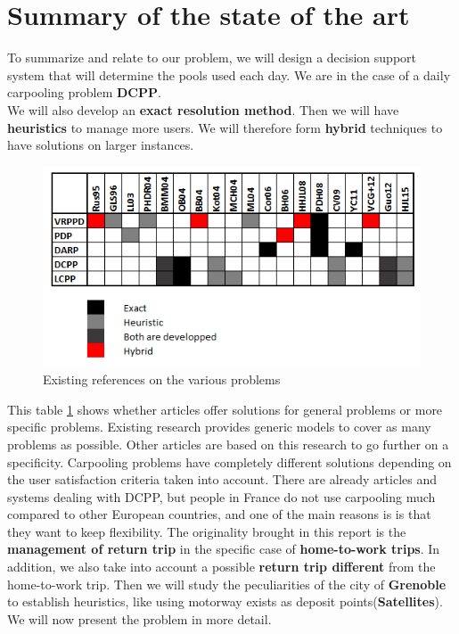 \documentclass[12pt, a4paper, twoside]{memoir}
\newcommand{\newpar}{\vskip 0.2in \noindent}
\begin{document}
{	%
	\section{Summary of the state of the art}
	
	To summarize and relate to our problem, we will design a decision support system that will determine the pools used each day. We are in the case of a daily carpooling problem \textbf{DCPP}. \\
	We will also develop an \textbf{exact resolution method}. Then we will have \textbf{heuristics} to manage more users. We will therefore form \textbf{hybrid} techniques to have solutions on larger instances.
	
	\begin{figure}[H]
		\centering
		\begin{flushleft}
			\includegraphics[scale=1.1]{img/i_table.png}
		\end{flushleft}
		\caption{Existing references on the various problems}
		\label{fig:Existing references on the different problems}
	\end{figure} 
	
	This table \ref{fig:Existing references on the different problems} shows whether articles offer solutions for general problems or more specific problems. Existing research provides generic models to cover as many problems as possible. Other articles are based on this research to go further on a specificity. Carpooling problems have completely different solutions depending on the user satisfaction criteria taken into account.
	\newpar
	There are already articles and systems dealing with DCPP, but people in France do not use carpooling much compared to other European countries, and one of the main reasons is is that they want to keep flexibility. \newline
	The originality brought in this report is the \textbf{management of return trip} in the specific case of \textbf{home-to-work trips}. \newline
	In addition, we also take into account a possible \textbf{return trip different} from the home-to-work trip. \newline
	Then we will study the peculiarities of the city of \textbf{Grenoble} to establish heuristics, like using motorway exists as deposit points(\textbf{Satellites}). 
	\newpar
	We will now present the problem in more detail.
	
}
\end{document}
